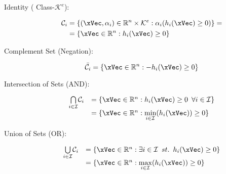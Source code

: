\begin{description}

    \item[Identity ( Class-\(\mathcal{K}^e\)):] 
    \begin{subequations}
        \begin{align}
            \mathcal{C}_i &= \{(\xVec, \alpha_i) \in \mathbb{R}^n \times \mathcal{K}^e: \alpha_i(h_i(\xVec) \geq 0)\} = 
            \label{eq:Indentity_set} \\
                          &= \{\xVec \in \mathbb{R}^n: h_i(\xVec) \geq 0\}
            \label{eq:Gen_Safe_set} 
        \end{align}
        
    \end{subequations}

    \item[Complement Set (Negation):] 
    
    \begin{equation}
        \bar{\mathcal{C}_i} = \{\xVec \in \mathbb{R}^n: -h_i(\xVec) \geq 0\} 
        \label{eq:Negation_set} 
    \end{equation}

    \item[Intersection of Sets (AND):] 

        \begin{equation}
            \begin{array}{rl}      
            \underset{i \in \mathcal{I}}{\bigcap} \mathcal{C}_i &= \{\xVec \in \mathbb{R}^n: h_i(\xVec) \geq 0 \hspace{0.5em} \forall i \in \mathcal{I}\}  \\
                                                      &= \{\xVec \in \mathbb{R}^n: \underset{i \in \mathcal{I}}{\min}(h_i(\xVec)) \geq 0 \} 
            \end{array}
            \label{eq:Intersection_set}
        \end{equation}

    \item[Union of Sets (OR):] 
    
        \begin{equation}
            \begin{array}{rl}
                \underset{i \in \mathcal{I}}{\bigcup} \mathcal{C}_i &= \{\xVec \in \mathbb{R}^n: \exists i \in \mathcal{I} \hspace{0.5em} st. \hspace{0.5em} h_i(\xVec) \geq 0 \}  \\
                                                          &= \{\xVec \in \mathbb{R}^n: \underset{i \in \mathcal{I}}{\max}(h_i(\xVec)) \geq 0 \} 
            \end{array}
            \label{eq:Union_set}
        \end{equation}
\end{description}

